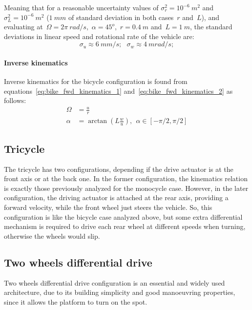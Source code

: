 Meaning that for a reasonable uncertainty values of $\sigma^2_r=10^{-6}\ m^2$ and $\sigma^2_L=10^{-6}\ m^2$ ($1\ mm$ of standard deviation in both cases~$r$ and~$L$), and evaluating at~$\Omega=2\pi\ rad/s$,~$\alpha=45^o$,~$r=0.4\ m$ and~$L=1\ m$, the standard deviations in linear speed and rotational rate of the vehicle are: 
\begin{equation}
 \sigma_u \approx 6\ mm/s ; \ \ \ \sigma_w \approx 4\ mrad/s ;
\end{equation}


\paragraph{Inverse kinematics}
Inverse kinematics for the bicycle configuration is found from equations~\ref{eq:bike_fwd_kinematics_1} and~\ref{eq:bike_fwd_kinematics_2} as follows: 
\begin{align}
 \Omega & = \frac{u}{r} \\
 \alpha & = \arctan(L\frac{w}{u}), \ \ \alpha \in [-\pi/2,\pi/2]
\end{align}


\subsection{Tricycle}
The tricycle has two configurations, depending if the drive actuator is at the front axis or at the back one. In the former configuration, the kinematics relation is exactly those previously analyzed for the monocycle case. However, in the later configuration, the driving actuator is attached at the rear axis, providing a forward velocity, while the front wheel just steers the vehicle. So, this configuration is like the bicycle case analyzed above, but some extra differential mechanism is required to drive each rear wheel at different speeds when turning, otherwise the wheels would slip. 


\subsection{Two wheels differential drive}
Two wheels differential drive configuration is an essential and widely used architecture, due to its building simplicity and good manoeuvring properties, since it allows the platform to turn on the spot. 

